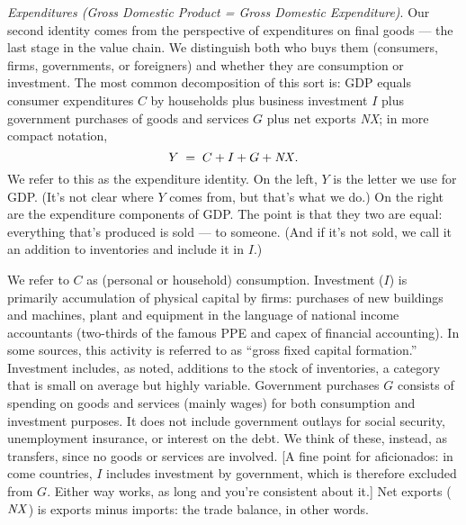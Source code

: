\documentclass[12pt,letterpaper]{article}
\newcommand{\NX}{\mbox{\em NX\/}}
\begin{document}
{\it Expenditures (Gross Domestic Product = Gross Domestic Expenditure)\/}.
Our second identity comes from the perspective of expenditures on final goods
--- the last stage in the value chain.
We distinguish both who buys them (consumers, firms, governments, or foreigners)
and whether they are consumption or investment.
The most common decomposition
of this sort is: GDP equals consumer expenditures $C$ by households
plus business investment $I$
plus government purchases of goods and services $G$
plus net exports \NX; in more compact notation,
\[
    Y \;=\; C+I+G+\NX .
\]
We refer to this as the expenditure identity.
On the left, $Y$ is the letter we use for GDP.
(It's not clear where $Y$ comes from, but that's what we do.)
On the right are the expenditure components of GDP.
The point is that they two are equal:
everything that's produced is sold --- to someone.
(And if it's not sold, we call it an addition to inventories
and include it in $I$.)


We refer to $C$ as (personal or household) consumption.
Investment ($I$) is primarily accumulation of physical capital by firms:
purchases of new buildings and machines, plant and equipment in
the language of national income accountants (two-thirds of the
famous PPE and capex of financial accounting).
In some sources, this activity is referred to as ``gross fixed capital formation.''
Investment includes, as noted, additions to the stock of inventories,
a category that is small on average but highly variable.
Government purchases $G$ consists of spending on goods and
services (mainly wages) for both consumption and investment purposes.
It does not include government outlays
for social security, unemployment insurance, or interest on the
debt. We think of these, instead, as transfers, since no goods or
services are involved.
[A fine point for aficionados:
in come countries, $I$ includes investment by government,
which is therefore excluded from $G$.
Either way works, as long and you're consistent about it.]
Net exports ($\NX$) is exports minus
imports:  the trade balance, in other words.
\end{document}
